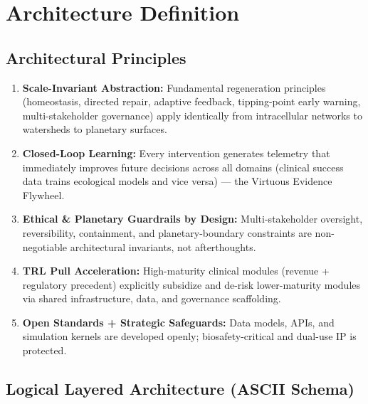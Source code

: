\documentclass[11pt,a4paper]{report}
\begin{document}
\chapter{Architecture Definition}

\section{Architectural Principles}

\begin{enumerate}
    \item \textbf{Scale-Invariant Abstraction:} Fundamental regeneration principles (homeostasis, directed repair, adaptive feedback, tipping-point early warning, multi-stakeholder governance) apply identically from intracellular networks to watersheds to planetary surfaces.
    \item \textbf{Closed-Loop Learning:} Every intervention generates telemetry that immediately improves future decisions across all domains (clinical success data trains ecological models and vice versa) --- the Virtuous Evidence Flywheel.
    \item \textbf{Ethical \& Planetary Guardrails by Design:} Multi-stakeholder oversight, reversibility, containment, and planetary-boundary constraints are non-negotiable architectural invariants, not afterthoughts.
    \item \textbf{TRL Pull Acceleration:} High-maturity clinical modules (revenue + regulatory precedent) explicitly subsidize and de-risk lower-maturity modules via shared infrastructure, data, and governance scaffolding.
    \item \textbf{Open Standards + Strategic Safeguards:} Data models, APIs, and simulation kernels are developed openly; biosafety-critical and dual-use IP is protected.
\end{enumerate}

\section{Logical Layered Architecture (ASCII Schema)}
\end{document}
